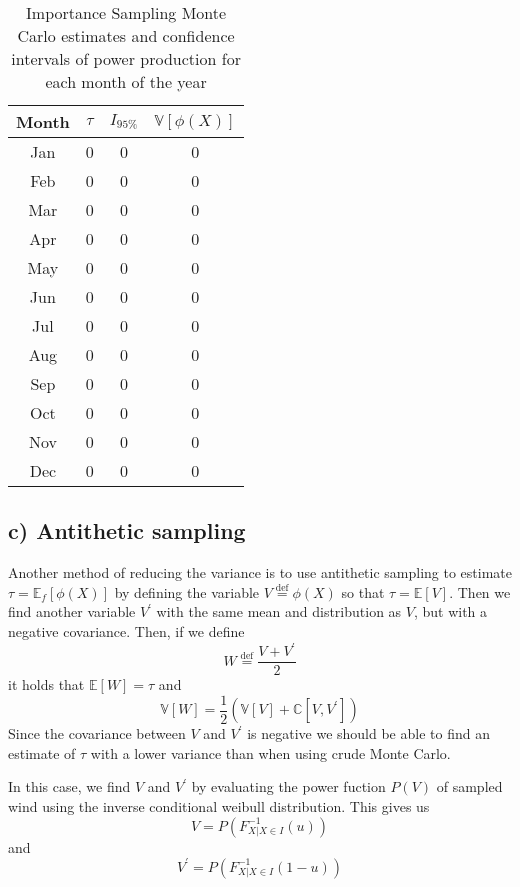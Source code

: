 \documentclass[a4paper]{article}
\begin{document}
\begin{table}
    \centering
    \caption{Importance Sampling Monte Carlo estimates and confidence intervals of power production for each month of the year}
    \label{ISresults}
    \begin{tabular}{|c|| c c c ||}
        \hline
        Month & $\tau$ & $I_{95\%}$ & $\mathbb{V}[\phi(X)]$ \\
        \hline\hline
        Jan & 0 & 0 & 0 \\
        \hline
        Feb & 0 & 0 & 0 \\
        \hline
        Mar & 0 & 0 & 0 \\
        \hline
        Apr & 0 & 0 & 0 \\
        \hline
        May & 0 & 0 & 0 \\
        \hline
        Jun & 0 & 0 & 0 \\
        \hline
        Jul & 0 & 0 & 0 \\
        \hline
        Aug & 0 & 0 & 0 \\
        \hline
        Sep & 0 & 0 & 0 \\
        \hline
        Oct & 0 & 0 & 0 \\
        \hline
        Nov & 0 & 0 & 0 \\
        \hline
        Dec & 0 & 0 & 0 \\
        \hline

    \end{tabular}
\end{table}

\subsection*{c) Antithetic sampling}
Another method of reducing the variance is to use antithetic sampling to estimate $\tau = \mathbb{E}_f[\phi (X)]$ by defining the variable $V \overset{\mathrm{def}}{=} \phi (X)$ so that $\tau = \mathbb{E}[V]$. Then we find another variable $V^\prime$ with the same mean and distribution as $V$, but with a negative covariance. Then, if we define $$W \overset{\mathrm{def}}{=} \frac{V + V^\prime}{2}$$ it holds that $\mathbb{E}[W] = \tau$ and $$\mathbb{V}[W] = \frac{1}{2}(\mathbb{V}[V] + \mathbb{C}[V, V^\prime])$$Since the covariance between $V$ and $V^\prime$ is negative we should be able to find an estimate of $\tau$ with a lower variance than when using crude Monte Carlo.

In this case, we find $V$ and $V^\prime$ by evaluating the power fuction $P(V)$ of sampled wind using the inverse conditional weibull distribution. This gives us
\begin{equation}
    V = P(F_{X|X\in I}^{-1}(u))
\end{equation}
and
\begin{equation}
    V^\prime = P(F_{X|X\in I}^{-1}(1-u))
\end{equation}
\end{document}
